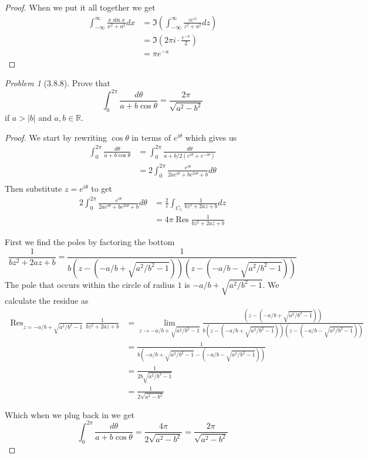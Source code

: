 \documentclass[10pt]{article}
\newcommand{\sk}{\vskip 10mm}
\newcommand{\bb}[1]{\mathbb{#1}}
\DeclareMathOperator{\Res}{Res}
\theoremstyle{remark}
\newtheorem{problem}{Problem}
\theoremstyle{remark}
\begin{document}
\begin{proof}
  When we put it all together we get
  \begin{align*}
    \int_{-\infty}^\infty\frac{x\sin x}{x^2+a^2}dx&=\Im\left(\int_{-\infty}^\infty\frac{ze^{iz}}{z^2+a^2} dz\right)\\
                                               &=\Im\left(2\pi i\cdot \frac{e^{-a}}{2}\right)\\
                                               &=\pi e^{-a}
  \end{align*}
\end{proof}

\sk

\begin{problem}[3.8.8]
  Prove that
  \[
    \int_0^{2\pi}\frac{d\theta}{a+b\cos\theta}=\frac{2\pi}{\sqrt{a^2-b^2}}
  \]
  if $a>|b|$ and $a,b\in\bb{R}$.
\end{problem}

\begin{proof}
  We start by rewriting $\cos\theta$ in terms of $e^{i\theta}$ which gives us
  \begin{align*}
    \int_0^{2\pi}\frac{d\theta}{a+b\cos\theta} &= \int_0^{2\pi}\frac{d\theta}{a+b/2\left(e^{i\theta}+e^{-i\theta}\right)}\\
                                            &= 2\int_0^{2\pi}\frac{e^{i\theta}}{2ae^{i\theta}+be^{2i\theta}+b}d\theta\\
  \end{align*}
  Then substitute $z=e^{i\theta}$ to get
  \begin{align*}
    2\int_0^{2\pi}\frac{e^{i\theta}}{2ae^{i\theta}+be^{2i\theta}+b}d\theta&= \frac{2}{i}\int_{C_1}\frac{1}{bz^2+2az+b}dz\\
                                                                     &= 4\pi\Res\frac{1}{bz^2+2az+b}
  \end{align*}

  First we find the poles by factoring the bottom
  \[
    \frac{1}{bz^2+2az+b}=\frac{1}{b\left(z-\left(-a/b+\sqrt{a^2/b^2-1}\right)\right)\left(z-\left(-a/b-\sqrt{a^2/b^2-1}\right)\right)}
  \]
  The pole that occurs within the circle of radius $1$ is $-a/b+\sqrt{a^2/b^2-1}$. We
  calculate the residue as
  \begin{align*}
    \Res_{z=-a/b+\sqrt{a^2/b^2-1}} \frac{1}{bz^2+2az+b} &= \lim_{z\rightarrow -a/b+\sqrt{a^2/b^2-1}}\frac{\left(z-\left(-a/b+\sqrt{a^2/b^2-1}\right)\right)}{b\left(z-\left(-a/b+\sqrt{a^2/b^2-1}\right)\right)\left(z-\left(-a/b-\sqrt{a^2/b^2-1}\right)\right)}\\
                                                     &=\frac{1}{b\left(-a/b+\sqrt{a^2/b^2-1}-\left(-a/b-\sqrt{a^2/b^2-1}\right)\right)}\\
                                                     &=\frac{1}{2b\sqrt{a^2/b^2-1}}\\
                                                     &=\frac{1}{2\sqrt{a^2-b^2}}
  \end{align*}

  Which when we plug back in we get
  \[
    \int_0^{2\pi}\frac{d\theta}{a+b\cos\theta}=\frac{4\pi}{2\sqrt{a^2-b^2}}=\frac{2\pi}{\sqrt{a^2-b^2}}
  \]
\end{proof}
\end{document}
